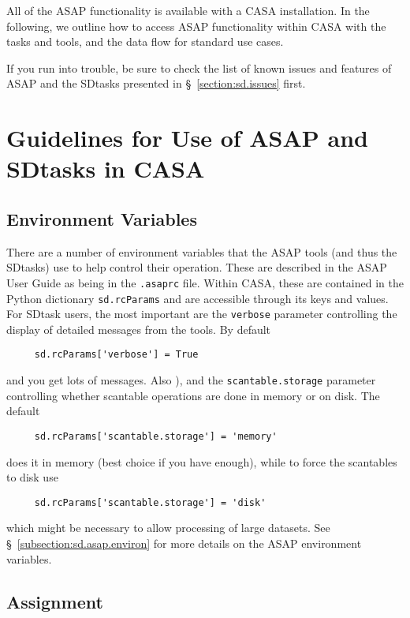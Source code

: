 All of the ASAP functionality is available with a CASA
installation.  In the following, we outline how to access ASAP
functionality within CASA with the tasks and tools,
and the data flow for standard use cases.

If you run into trouble, be sure to check the list of known issues
and features of ASAP and the SDtasks presented in 
\S~\ref{section:sd.issues} first.

\section{Guidelines for Use of ASAP and SDtasks in CASA}
\label{section:sd.intro}

\subsection{Environment Variables}
\label{section:sd.intro.env}

There are a number of environment variables that the ASAP tools
(and thus the SDtasks) use to help control their operation.
These are described in the ASAP User Guide as being in the 
{\tt .asaprc} file.  Within CASA, these are contained in the
Python dictionary {\tt sd.rcParams} and are accessible through
its keys and values.  For SDtask users, the most important are the
{\tt verbose} parameter controlling the display of detailed
messages from the tools. By default 
\small
\begin{verbatim}
     sd.rcParams['verbose'] = True
\end{verbatim}
\normalsize
and you get lots of messages.  Also
), and the {\tt scantable.storage}
parameter controlling whether scantable operations are done
in memory or on disk.  The default 
\small
\begin{verbatim}
     sd.rcParams['scantable.storage'] = 'memory'
\end{verbatim}
\normalsize
does it in memory (best choice if you have enough), while to
force the scantables to disk use
\small
\begin{verbatim}
     sd.rcParams['scantable.storage'] = 'disk'
\end{verbatim}
\normalsize
which might be necessary to allow processing of large datasets.
See \S~\ref{subsection:sd.asap.environ} for more details on the
ASAP environment variables.

\subsection{Assignment}
\label{section:sd.intro.ass}

